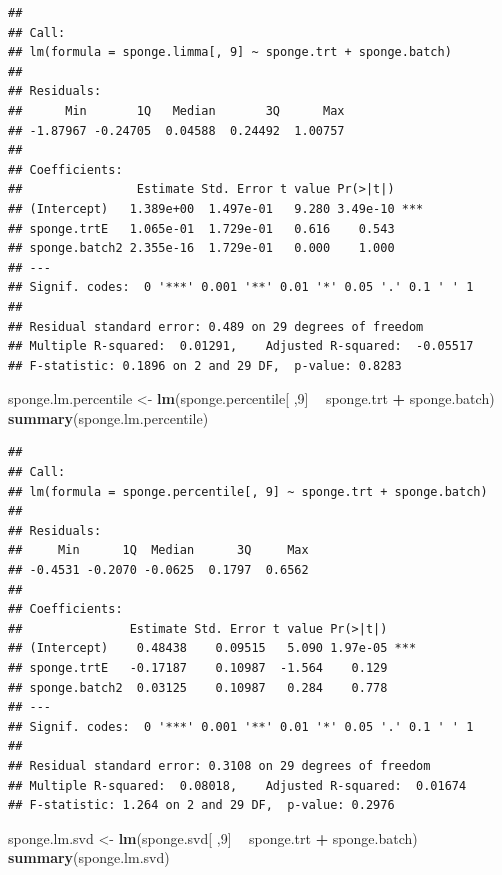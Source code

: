 \documentclass[]{book}
\newenvironment{Shaded}{\begin{snugshade}}{\end{snugshade}}
\newcommand{\KeywordTok}[1]{\textcolor[rgb]{0.13,0.29,0.53}{\textbf{#1}}}
\newcommand{\DecValTok}[1]{\textcolor[rgb]{0.00,0.00,0.81}{#1}}
\newcommand{\StringTok}[1]{\textcolor[rgb]{0.31,0.60,0.02}{#1}}
\newcommand{\OperatorTok}[1]{\textcolor[rgb]{0.81,0.36,0.00}{\textbf{#1}}}
\newcommand{\NormalTok}[1]{#1}
\begin{document}
\begin{verbatim}
## 
## Call:
## lm(formula = sponge.limma[, 9] ~ sponge.trt + sponge.batch)
## 
## Residuals:
##      Min       1Q   Median       3Q      Max 
## -1.87967 -0.24705  0.04588  0.24492  1.00757 
## 
## Coefficients:
##                Estimate Std. Error t value Pr(>|t|)    
## (Intercept)   1.389e+00  1.497e-01   9.280 3.49e-10 ***
## sponge.trtE   1.065e-01  1.729e-01   0.616    0.543    
## sponge.batch2 2.355e-16  1.729e-01   0.000    1.000    
## ---
## Signif. codes:  0 '***' 0.001 '**' 0.01 '*' 0.05 '.' 0.1 ' ' 1
## 
## Residual standard error: 0.489 on 29 degrees of freedom
## Multiple R-squared:  0.01291,    Adjusted R-squared:  -0.05517 
## F-statistic: 0.1896 on 2 and 29 DF,  p-value: 0.8283
\end{verbatim}

\begin{Shaded}
\begin{Highlighting}[]
\NormalTok{sponge.lm.percentile <-}\StringTok{ }\KeywordTok{lm}\NormalTok{(sponge.percentile[ ,}\DecValTok{9}\NormalTok{] }\OperatorTok{~}\StringTok{ }\NormalTok{sponge.trt }\OperatorTok{+}\StringTok{ }\NormalTok{sponge.batch)}
\KeywordTok{summary}\NormalTok{(sponge.lm.percentile)}
\end{Highlighting}
\end{Shaded}

\begin{verbatim}
## 
## Call:
## lm(formula = sponge.percentile[, 9] ~ sponge.trt + sponge.batch)
## 
## Residuals:
##     Min      1Q  Median      3Q     Max 
## -0.4531 -0.2070 -0.0625  0.1797  0.6562 
## 
## Coefficients:
##               Estimate Std. Error t value Pr(>|t|)    
## (Intercept)    0.48438    0.09515   5.090 1.97e-05 ***
## sponge.trtE   -0.17187    0.10987  -1.564    0.129    
## sponge.batch2  0.03125    0.10987   0.284    0.778    
## ---
## Signif. codes:  0 '***' 0.001 '**' 0.01 '*' 0.05 '.' 0.1 ' ' 1
## 
## Residual standard error: 0.3108 on 29 degrees of freedom
## Multiple R-squared:  0.08018,    Adjusted R-squared:  0.01674 
## F-statistic: 1.264 on 2 and 29 DF,  p-value: 0.2976
\end{verbatim}

\begin{Shaded}
\begin{Highlighting}[]
\NormalTok{sponge.lm.svd <-}\StringTok{ }\KeywordTok{lm}\NormalTok{(sponge.svd[ ,}\DecValTok{9}\NormalTok{] }\OperatorTok{~}\StringTok{ }\NormalTok{sponge.trt }\OperatorTok{+}\StringTok{ }\NormalTok{sponge.batch)}
\KeywordTok{summary}\NormalTok{(sponge.lm.svd)}
\end{Highlighting}
\end{Shaded}
\end{document}
